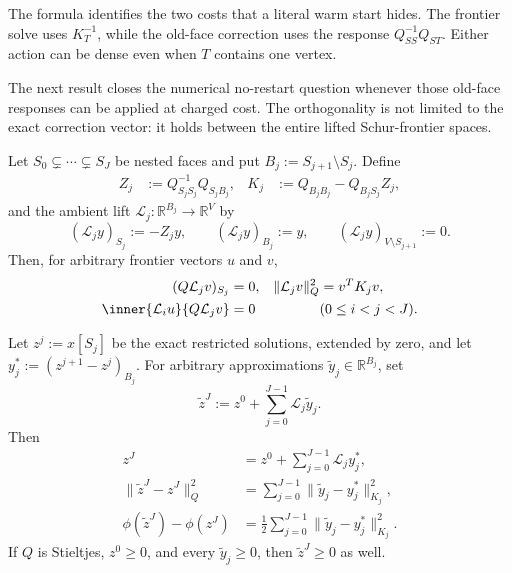 The formula identifies the two costs that a literal warm start hides.  The
frontier solve uses $K_T^{-1}$, while the old-face correction uses the response
$Q_{SS}^{-1}Q_{ST}$.  Either action can be dense even when $T$ contains one
vertex.

The next result closes the numerical no-restart question whenever those
old-face responses can be applied at charged cost.  The orthogonality is not
limited to the exact correction vector: it holds between the entire lifted
Schur-frontier spaces.

\begin{theorem}
\label{thm:orthogonal-frontier-lifts}
Let $S_0\subsetneq\cdots\subsetneq S_J$ be nested faces and put
$B_j:=S_{j+1}\setminus S_j$.  Define
\begin{align}
 Z_j&:=Q_{S_jS_j}^{-1}Q_{S_jB_j},
 &K_j&:=Q_{B_jB_j}-Q_{B_jS_j}Z_j,
 \label{eq:frontier-lift-blocks}
\end{align}
and the ambient lift $\mathcal L_j:\mathbb R^{B_j}\to\mathbb R^V$ by
\begin{equation}
 (\mathcal L_jy)_{S_j}:=-Z_jy,
 \qquad
 (\mathcal L_jy)_{B_j}:=y,
 \qquad
 (\mathcal L_jy)_{V\setminus S_{j+1}}:=0.
 \label{eq:frontier-lift}
\end{equation}
Then, for arbitrary frontier vectors $u$ and $v$,
\begin{align}
 (Q\mathcal L_jv)_{S_j}&=0,
 &\|\mathcal L_jv\|_Q^2&=v^TK_jv,
 \label{eq:frontier-lift-isometry}\\
 \inner{\mathcal L_i u}{Q\mathcal L_j v}&=0
 &&(0\leq i<j<J).
 \label{eq:frontier-lift-orthogonality}
\end{align}

Let $z^j:=x[S_j]$ be the exact restricted solutions, extended by zero, and
let $y_j^*:=(z^{j+1}-z^j)_{B_j}$.  For arbitrary approximations
$\widetilde y_j\in\mathbb R^{B_j}$, set
\begin{equation}
 \widetilde z^J
 :=z^0+\sum_{j=0}^{J-1}\mathcal L_j\widetilde y_j.
 \label{eq:approximate-lifted-trajectory}
\end{equation}
Then
\begin{align}
 z^J&=z^0+\sum_{j=0}^{J-1}\mathcal L_jy_j^*,
 \label{eq:exact-lifted-trajectory}\\
 \|\widetilde z^J-z^J\|_Q^2
 &=\sum_{j=0}^{J-1}
   \|\widetilde y_j-y_j^*\|_{K_j}^2,
 \label{eq:lifted-error-pythagoras}\\
 \phi(\widetilde z^J)-\phi(z^J)
 &=\frac12\sum_{j=0}^{J-1}
   \|\widetilde y_j-y_j^*\|_{K_j}^2.
 \label{eq:lifted-objective-pythagoras}
\end{align}
If $Q$ is Stieltjes, $z^0\geq0$, and every $\widetilde y_j\geq0$, then
$\widetilde z^J\geq0$ as well.
\end{theorem}

